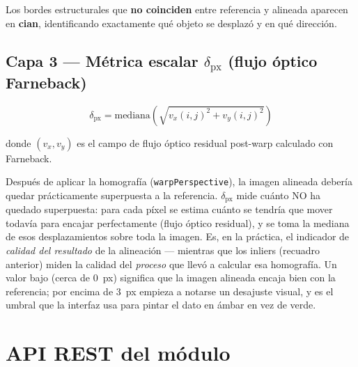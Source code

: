 Los bordes estructurales que \textbf{no coinciden} entre referencia y alineada aparecen en
\textbf{cian}, identificando exactamente qué objeto se desplazó y en qué dirección.

\subsection{Capa 3 — Métrica escalar $\delta_{\text{px}}$ (flujo óptico Farneback)}
\label{sec:delta}

\begin{equation}
  \delta_{\text{px}} = \text{mediana}\left(
    \sqrt{v_x(i,j)^2 + v_y(i,j)^2}
  \right)
\end{equation}

donde $(v_x, v_y)$ es el campo de flujo óptico residual post-warp calculado con Farneback.

\begin{infobox}
Después de aplicar la homografía (\texttt{warpPerspective}), la imagen alineada debería quedar
prácticamente superpuesta a la referencia. $\delta_{\text{px}}$ mide cuánto NO ha quedado
superpuesta: para cada píxel se estima cuánto se tendría que mover todavía para encajar
perfectamente (flujo óptico residual), y se toma la mediana de esos desplazamientos sobre toda
la imagen. Es, en la práctica, el indicador de \emph{calidad del resultado} de la alineación —
mientras que los inliers (recuadro anterior) miden la calidad del \emph{proceso} que llevó a
calcular esa homografía. Un valor bajo (cerca de 0~px) significa que la imagen alineada encaja
bien con la referencia; por encima de 3~px empieza a notarse un desajuste visual, y es el
umbral que la interfaz usa para pintar el dato en ámbar en vez de verde.
\end{infobox}

\section{API REST del módulo}
\label{sec:api}

